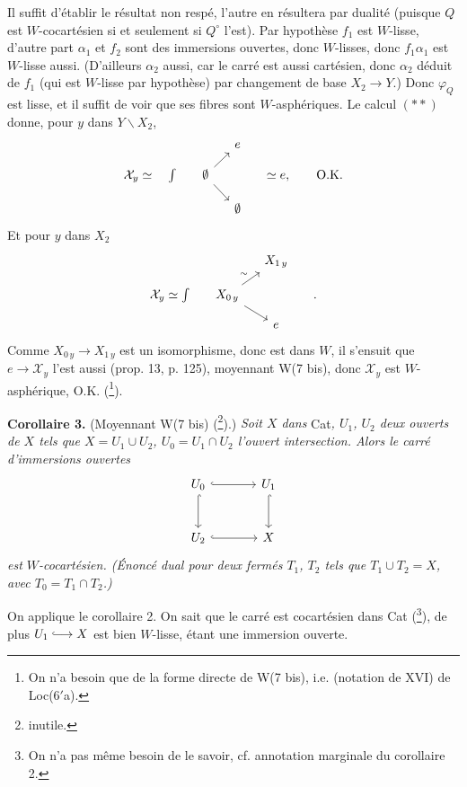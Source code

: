 Il suffit d'établir le résultat non respé, l'autre en résultera par dualité (puisque $Q$ est $W$-cocartésien si et seulement si $Q^\circ$ l'est). Par hypothèse $f_1$ est $W$-lisse, d'autre part $\alpha_1$ et $f_2$ sont des immersions ouvertes, donc $W$-lisses, donc $f_1\alpha_1$ est $W$-lisse aussi. (D'ailleurs $\alpha_2$ aussi, car le carré est aussi cartésien, donc $\alpha_2$ déduit de $f_1$ (qui est $W$-lisse par hypothèse) par changement de base $X_2 \longrightarrow Y$.) Donc $\varphi_Q$ est lisse, et il suffit de voir que ses fibres sont $W$-asphériques. Le calcul $(**)$ donne, pour $y$ dans $Y\backslash X_2$,
\[
\begin{tikzcd}[row sep=small, column sep=small]
 & & e & \\
\mathcal{X}_y \simeq \quad \int &[-1.2em] \emptyset \arrow[ur] \arrow[dr] & &[1em] \simeq e, \qquad \text{O.K.} \\
 & & \emptyset &
\end{tikzcd}
\]
Et pour $y$ dans $X_2$
\[
\begin{tikzcd}[row sep=small, column sep=small]
 & & X_{1\,y} & \\
\mathcal{X}_y \simeq \int &[-1.2em] X_{0\,y} \arrow[ur,"\sim"] \arrow[dr] & &[2em] . \\
 & & e &
\end{tikzcd}
\]
Comme $X_{0\,y} \longrightarrow X_{1\,y}$ est un isomorphisme, donc est dans $W$, il s'ensuit que $e \longrightarrow \mathcal{X}_y$ l'est aussi (prop. 13, p. 125), moyennant W(7 bis), donc $\mathcal{X}_y$ est $W$-asphérique, O.K. (\footnote{On n'a besoin que de la forme directe de W(7 bis), i.e. (notation de XVI) de Loc(6$'$a).}).

\textbf{Corollaire 3.} (Moyennant W(7 bis) (\footnote{inutile.}).) \textit{Soit $X$ dans} Cat\textit{, $U_1$, $U_2$ deux ouverts de $X$ tels que $X = U_1 \cup U_2$, $U_0 = U_1 \cap U_2$ l'ouvert intersection. Alors le carré d'immersions ouvertes}
\[
\begin{tikzcd}[row sep=large, column sep=large]
U_0 \arrow[r,hook] \arrow[d,hook] & U_1 \arrow[d,hook] \\
U_2 \arrow[r,hook] & X
\end{tikzcd}
\]
\textit{est $W$-cocartésien. (Énoncé dual pour deux fermés $T_1$, $T_2$ tels que $T_1 \cup T_2 = X$, avec $T_0 = T_1 \cap T_2$.)}

On applique le corollaire 2. On sait que le carré est cocartésien dans Cat (\footnote{On n'a pas même besoin de le savoir, cf. annotation marginale du corollaire 2.}), de plus $U_1 \lhook\joinrel\longrightarrow X$ est bien $W$-lisse, étant une immersion ouverte.

